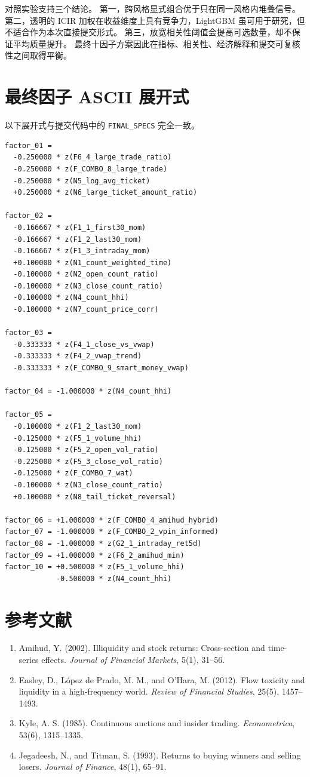 \documentclass[UTF8,11pt,a4paper]{ctexart}
\begin{document}
对照实验支持三个结论。
第一，跨风格显式组合优于只在同一风格内堆叠信号。
第二，透明的 ICIR 加权在收益维度上具有竞争力，LightGBM 虽可用于研究，但不适合作为本次直接提交形式。
第三，放宽相关性阈值会提高可选数量，却不保证平均质量提升。
最终十因子方案因此在指标、相关性、经济解释和提交可复核性之间取得平衡。

\appendix
\section{最终因子 ASCII 展开式}

以下展开式与提交代码中的 \texttt{FINAL\_SPECS} 完全一致。
\begin{verbatim}
factor_01 =
  -0.250000 * z(F6_4_large_trade_ratio)
  -0.250000 * z(F_COMBO_8_large_trade)
  -0.250000 * z(N5_log_avg_ticket)
  +0.250000 * z(N6_large_ticket_amount_ratio)

factor_02 =
  -0.166667 * z(F1_1_first30_mom)
  -0.166667 * z(F1_2_last30_mom)
  -0.166667 * z(F1_3_intraday_mom)
  +0.100000 * z(N1_count_weighted_time)
  -0.100000 * z(N2_open_count_ratio)
  -0.100000 * z(N3_close_count_ratio)
  -0.100000 * z(N4_count_hhi)
  -0.100000 * z(N7_count_price_corr)

factor_03 =
  -0.333333 * z(F4_1_close_vs_vwap)
  -0.333333 * z(F4_2_vwap_trend)
  -0.333333 * z(F_COMBO_9_smart_money_vwap)

factor_04 = -1.000000 * z(N4_count_hhi)

factor_05 =
  -0.100000 * z(F1_2_last30_mom)
  -0.125000 * z(F5_1_volume_hhi)
  -0.125000 * z(F5_2_open_vol_ratio)
  -0.225000 * z(F5_3_close_vol_ratio)
  -0.125000 * z(F_COMBO_7_wat)
  -0.100000 * z(N3_close_count_ratio)
  +0.100000 * z(N8_tail_ticket_reversal)

factor_06 = +1.000000 * z(F_COMBO_4_amihud_hybrid)
factor_07 = -1.000000 * z(F_COMBO_2_vpin_informed)
factor_08 = -1.000000 * z(G2_1_intraday_ret5d)
factor_09 = +1.000000 * z(F6_2_amihud_min)
factor_10 = +0.500000 * z(F5_1_volume_hhi)
            -0.500000 * z(N4_count_hhi)
\end{verbatim}

\section{参考文献}
\begin{enumerate}[leftmargin=2em]
  \item Amihud, Y. (2002). Illiquidity and stock returns: Cross-section and time-series effects. \textit{Journal of Financial Markets}, 5(1), 31--56.
  \item Easley, D., L{\'o}pez de Prado, M. M., and O'Hara, M. (2012). Flow toxicity and liquidity in a high-frequency world. \textit{Review of Financial Studies}, 25(5), 1457--1493.
  \item Kyle, A. S. (1985). Continuous auctions and insider trading. \textit{Econometrica}, 53(6), 1315--1335.
  \item Jegadeesh, N., and Titman, S. (1993). Returns to buying winners and selling losers. \textit{Journal of Finance}, 48(1), 65--91.
\end{enumerate}
\end{document}
